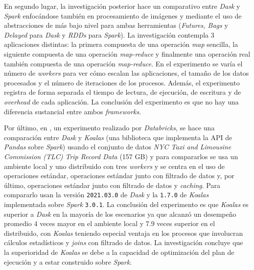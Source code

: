 En segundo lugar, la investigación posterior \cite{dask-spark-neuroimaging} hace un comparativo entre \textit{Dask} y \textit{Spark} enfocándose también en procesamiento de imágenes y mediante el uso de abstracciones de más bajo nivel para ambas herramientas (\textit{Futures, Bags} y \textit{Delayed} para \textit{Dask} y \textit{RDDs} para \textit{Spark}). La investigación contempla 3 aplicaciones distintas: la primera compuesta de una operación \textit{map} sencilla, la siguiente compuesta de una operación \textit{map-reduce} y finalmente una operación real también compuesta de una operación \textit{map-reduce}. En el experimento se varía el número de \textit{workers} para ver cómo escalan las aplicaciones, el tamaño de los datos procesados y el número de iteraciones de los procesos. Además, el experimento registra de forma separada el tiempo de lectura, de ejecución, de escritura y de \textit{overhead} de cada aplicación. La conclusión del experimento es que no hay una diferencia sustancial entre ambos \textit{frameworks}.

Por último, en \cite{koalas-dask}, un experimento realizado por \textit{Databricks}, se hace una comparación entre \textit{Dask} y \textit{Koalas} (una biblioteca que implementa la API de \textit{Pandas} sobre \textit{Spark}) usando el conjunto de datos \textit{NYC Taxi and Limousine Commission (TLC) Trip Record Data} (157 GB) y para compararlos se usa un ambiente local y uno distribuido con tres \textit{workers} y se centra en el uso de operaciones estándar, operaciones estándar junto con filtrado de datos y, por último, operaciones estándar junto con filtrado de datos y \textit{caching}. Para compararlo usan la versión \texttt{2021.03.0} de \textit{Dask} y la \texttt{1.7.0} de \textit{Koalas} implementada sobre \textit{Spark} \texttt{3.0.1}. La conclusión del experimento es que \textit{Koalas} es superior a \textit{Dask} en la mayoría de los escenarios ya que alcanzó un desempeño promedio 4 veces mayor en el ambiente local y 7.9 veces superior en el distribuido, con \textit{Koalas} teniendo especial ventaja en los procesos que involucran cálculos estadísticos y \textit{joins} con filtrado de datos. La investigación concluye que la superioridad de \textit{Koalas} se debe a la capacidad de optimización del plan de ejecución y a estar construido sobre \textit{Spark}.

\newpage

